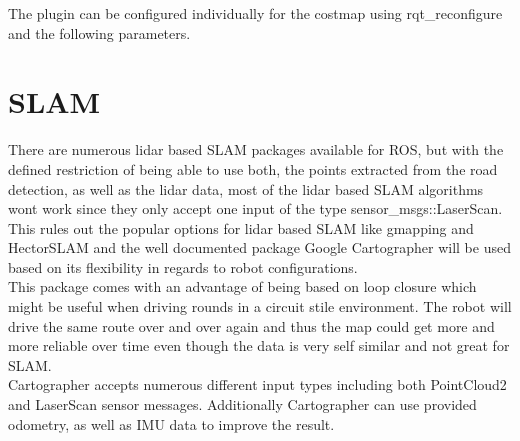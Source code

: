 The plugin can be configured individually for the costmap using rqt\_reconfigure and the following parameters.

\begin{table}[H]
\centering
{}
\label{dynlayerparams}
\caption{dynamic\_cost\_layer parameters}
\end{table}



\section{SLAM}
There are numerous lidar based SLAM packages available for ROS, but with the defined restriction of being able to use both, the points extracted from the road detection, as well as the lidar data, most of the lidar based SLAM algorithms wont work since they only accept one input of  the type sensor\_msgs::LaserScan.\\
This rules out the popular options for lidar based SLAM like gmapping and HectorSLAM and the well documented package Google Cartographer will be used based on its flexibility in regards to robot configurations.\\
This package comes with an advantage of being based on loop closure which might be useful when driving rounds in a circuit stile environment. The robot will drive the same route over and over again and thus the map could get more and more reliable over time even though the data is very self similar and not great for SLAM.\\

Cartographer accepts numerous different input types including both PointCloud2 and LaserScan sensor messages. Additionally Cartographer can use provided odometry, as well as IMU data to improve the result.\\








